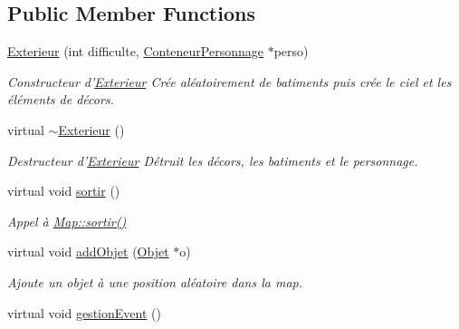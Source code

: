 \subsection*{Public Member Functions}
\begin{DoxyCompactItemize}
\item 
\hyperlink{classExterieur_a8d35b43350b8d273043bfc9704c50e67}{Exterieur} (int difficulte, \hyperlink{classConteneurPersonnage}{Conteneur\-Personnage} $\ast$perso)
\begin{DoxyCompactList}\small\item\em Constructeur d'\hyperlink{classExterieur}{Exterieur} Crée aléatoirement de batiments puis crée le ciel et les éléments de décors. \end{DoxyCompactList}\item 
\hypertarget{classExterieur_a98dd5cc5591c46b7f148738dbb18842d}{virtual \hyperlink{classExterieur_a98dd5cc5591c46b7f148738dbb18842d}{$\sim$\-Exterieur} ()}\label{classExterieur_a98dd5cc5591c46b7f148738dbb18842d}

\begin{DoxyCompactList}\small\item\em Destructeur d'\hyperlink{classExterieur}{Exterieur} Détruit les décors, les batiments et le personnage. \end{DoxyCompactList}\item 
\hypertarget{classExterieur_af2a11d0728389f34d9e3e27d9bf0b30e}{virtual void \hyperlink{classExterieur_af2a11d0728389f34d9e3e27d9bf0b30e}{sortir} ()}\label{classExterieur_af2a11d0728389f34d9e3e27d9bf0b30e}

\begin{DoxyCompactList}\small\item\em Appel à \hyperlink{classMap_a483d996c2d56cf7af870bde2a63423dc}{Map\-::sortir()} \end{DoxyCompactList}\item 
virtual void \hyperlink{classExterieur_a046ad698b3a16809b6213459a8d2cb3f}{add\-Objet} (\hyperlink{classObjet}{Objet} $\ast$o)
\begin{DoxyCompactList}\small\item\em Ajoute un objet à une position aléatoire dans la map. \end{DoxyCompactList}\item 
\hypertarget{classExterieur_ae412ede4d4f1e3bcbb50100c20ad8225}{virtual void \hyperlink{classExterieur_ae412ede4d4f1e3bcbb50100c20ad8225}{gestion\-Event} ()}\label{classExterieur_ae412ede4d4f1e3bcbb50100c20ad8225}


\end{DoxyCompactItemize}
